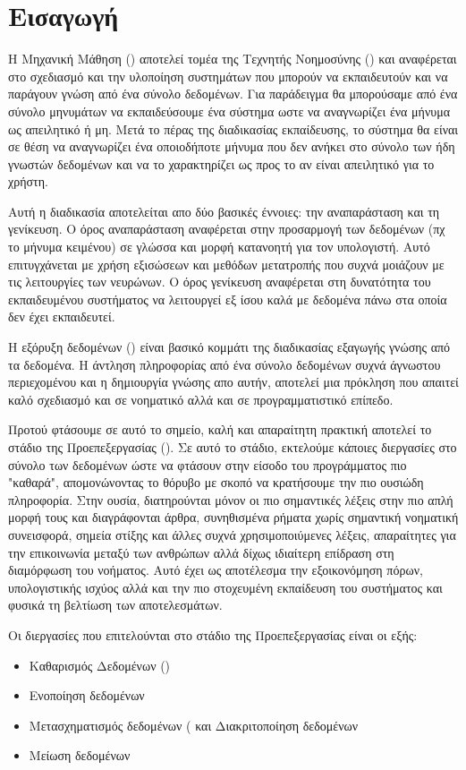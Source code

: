\chapter{Εισαγωγή}

Η Μηχανική Μάθηση () αποτελεί τομέα της Τεχνητής Νοημοσύνης () και αναφέρεται στο σχεδιασμό και την υλοποίηση συστημάτων που μπορούν να εκπαιδευτούν και να παράγουν γνώση από ένα σύνολο δεδομένων. Για παράδειγμα θα μπορούσαμε από ένα σύνολο μηνυμάτων να εκπαιδεύσουμε ένα σύστημα ωστε να αναγνωρίζει ένα μήνυμα ως απειλητικό ή μη. Μετά το πέρας της διαδικασίας εκπαίδευσης, το σύστημα θα είναι σε θέση να αναγνωρίζει ένα οποιοδήποτε μήνυμα που δεν ανήκει στο σύνολο των ήδη γνωστών δεδομένων και να το χαρακτηρίζει ως προς το αν είναι απειλητικό για το χρήστη.

Αυτή η διαδικασία αποτελείται απο δύο βασικές έννοιες: την αναπαράσταση και τη γενίκευση. Ο όρος αναπαράσταση αναφέρεται στην προσαρμογή των δεδομένων (πχ το μήνυμα κειμένου) σε γλώσσα και μορφή κατανοητή για τον υπολογιστή. Αυτό επιτυγχάνεται με χρήση εξισώσεων και μεθόδων μετατροπής που συχνά μοιάζουν με τις λειτουργίες των νευρώνων. Ο όρος γενίκευση αναφέρεται στη δυνατότητα του εκπαιδευμένου συστήματος να λειτουργεί εξ ίσου καλά με δεδομένα πάνω στα οποία δεν έχει εκπαιδευτεί.

Η εξόρυξη δεδομένων () είναι βασικό κομμάτι της διαδικασίας εξαγωγής γνώσης από τα δεδομένα. Η άντληση πληροφορίας από ένα σύνολο δεδομένων συχνά άγνωστου περιεχομένου και η δημιουργία γνώσης απο αυτήν, αποτελεί μια πρόκληση που απαιτεί καλό σχεδιασμό και σε νοηματικό αλλά και σε προγραμματιστικό επίπεδο.

Προτού φτάσουμε σε αυτό το σημείο, καλή και απαραίτητη πρακτική αποτελεί το στάδιο της Προεπεξεργασίας (). Σε αυτό το στάδιο, εκτελούμε κάποιες διεργασίες στο σύνολο των δεδομένων ώστε να φτάσουν στην είσοδο του προγράμματος πιο "καθαρά", απομονώνοντας το θόρυβο με σκοπό να κρατήσουμε την πιο ουσιώδη πληροφορία. Στην ουσία, διατηρούνται μόνον οι πιο σημαντικές λέξεις στην πιο απλή μορφή τους και διαγράφονται άρθρα, συνηθισμένα ρήματα χωρίς σημαντική νοηματική συνεισφορά, σημεία στίξης και άλλες συχνά χρησιμοποιύμενες λέξεις, απαραίτητες για την επικοινωνία μεταξύ των ανθρώπων αλλά δίχως ιδιαίτερη επίδραση στη διαμόρφωση του νοήματος. Αυτό έχει ως αποτέλεσμα την εξοικονόμηση πόρων, υπολογιστικής ισχύος αλλά και την πιο στοχευμένη εκπαίδευση του συστήματος και φυσικά τη βελτίωση των αποτελεσμάτων.

Οι διεργασίες που επιτελούνται στο στάδιο της Προεπεξεργασίας είναι οι εξής:
\begin{itemize}
	\item Καθαρισμός Δεδομένων ()
    \item Ενοποίηση δεδομένων 
    \item Μετασχηματισμός δεδομένων ( και Διακριτοποίηση δεδομένων 
    \item Μείωση δεδομένων 
\end{itemize}

